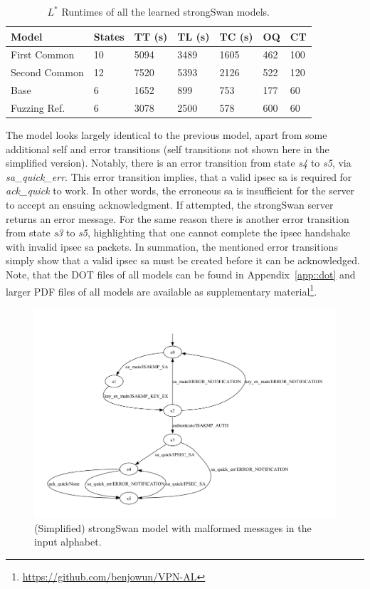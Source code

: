 \begin{table}[h]
	\centering
	\begin{tabular}{|l|l|l|l|l|l|l|}
		\hline
		\rowcolor[HTML]{C0C0C0} 
		Model     & States & TT (s)   & TL (s)   & TC (s)   & OQ  & CT  \\ \hline
		First Common  & 10     & 5094 & 3489 & 1605 & 462 & 100 \\ \hline
		Second Common  & 12     & 7520 & 5393 & 2126 & 522 & 120 \\ \hline
		Base      & 6      & 1652 & 899  & 753  & 177 & 60  \\ \hline
		Fuzzing Ref. & 6      & 3078 & 2500 & 578  & 600 & 60  \\ \hline
	\end{tabular}
	\caption{$L^*$ Runtimes of all the learned strongSwan models.}
	\label{tab:runtime_summary_lstar}
\end{table}

The model looks largely identical to the previous model, apart from some additional self and error transitions (self transitions not shown here in the simplified version). Notably, there is an error transition from state \emph{s4} to \emph{s5}, via \emph{sa\_quick\_err}. This error transition implies, that a valid \ac{ipsec} \ac{sa} is required for \emph{ack\_quick} to work. In other words, the erroneous \ac{sa} is insufficient for the server to accept an ensuing acknowledgment. If attempted, the strongSwan server returns an error message. For the same reason there is another error transition from state \emph{s3} to \emph{s5}, highlighting that one cannot complete the \ac{ipsec} handshake with invalid \ac{ipsec} \ac{sa} packets. In summation, the mentioned error transitions simply show that a valid \ac{ipsec} \ac{sa} must be created before it can be acknowledged. Note, that the DOT files of all models can be found in Appendix~\ref{app::dot} and larger PDF files of all models are available as supplementary material\footnote{\url{https://github.com/benjowun/VPN-AL}}.

\begin{figure}
	\centering
	\includegraphics[width=\linewidth]{images/models/strongSwanErrKV}
	\caption{(Simplified) strongSwan model with malformed messages in the input alphabet.}
	\label{fig:withfilterwitherrors}
\end{figure}


